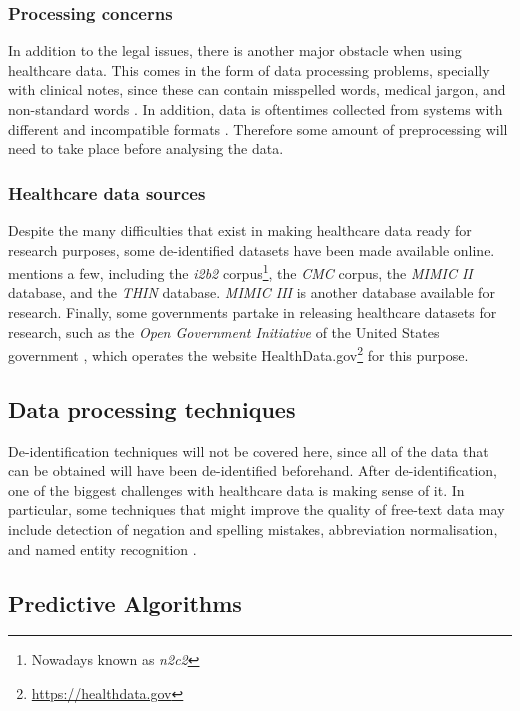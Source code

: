 \documentclass[a4paper,12pt]{article}
\begin{document}
\subsubsection{Processing concerns}

In addition to the legal issues, there is another major obstacle when using healthcare data.
This comes in the form of data processing problems, specially with clinical notes, since these can contain misspelled words, medical jargon, and non-standard words \parencite{Dalianis2015}.
In addition, data is oftentimes collected from systems with different and incompatible formats \parencite[34]{Consoli2019}.
Therefore some amount of preprocessing will need to take place before analysing the data.


\subsubsection{Healthcare data sources}

Despite the many difficulties that exist in making healthcare data ready for research purposes, some de-identified datasets have been made available online.
\textcite{Dalianis2015} mentions a few, including the \textit{i2b2} corpus\footnote{Nowadays known as \textit{n2c2}}, the \textit{CMC} corpus, the \textit{MIMIC II} database, and the \textit{THIN} database. \textit{MIMIC III} \parencite{Johnson2016} is another database available for research.
Finally, some governments partake in releasing healthcare datasets for research, such as the \textit{Open Government Initiative} of the United States government \parencite{Marc2015}, which operates the website HealthData.gov\footnote{\url{https://healthdata.gov}} for this purpose.

\subsection{Data processing techniques}

De-identification techniques will not be covered here, since all of the data that can be obtained will have been de-identified beforehand.
After de-identification, one of the biggest challenges with healthcare data is making sense of it.
In particular, some techniques that might improve the quality of free-text data may include detection of negation and spelling mistakes, abbreviation normalisation, and named entity recognition \parencite{Dalianis2015}.

\subsection{Predictive Algorithms}
\end{document}
